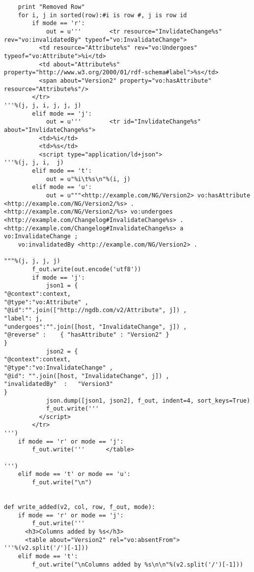\begin{verbatim}
	print "Removed Row"
	for i, j in sorted(row):#i is row #, j is row id
		if mode == 'r':
			out = u'''        <tr resource="InvlidateChange%s" rev="vo:invalidatedBy" typeof="vo:InvalidateChange">
          <td resource="Attribute%s" rev="vo:Undergoes" typeof="vo:Attribute">%i</td>
          <td about="Attribute%s" property="http://www.w3.org/2000/01/rdf-schema#label">%s</td>
          <span about="Version2" property="vo:hasAttribute" resource="Attribute%s"/>
        </tr>
'''%(j, j, i, j, j, j)
		elif mode == 'j':
			out = u'''        <tr id="InvlidateChange%s" about="InvlidateChange%s">
          <td>%i</td>
          <td>%s</td>
          <script type="application/ld+json">
'''%(j, j, i,  j)
		elif mode == 't':
			out = u"%i\t%s\n"%(i, j)
		elif mode == 'u':
			out = u"""<http://example.com/NG/Version2> vo:hasAttribute <http://example.com/NG/Version2/%s> .
<http://example.com/NG/Version2/%s> vo:undergoes <http://example.com/Changelog#InvalidateChange%s> .
<http://example.com/Changelog#InvalidateChange%s> a vo:InvalidateChange ;
	vo:invalidatedBy <http://example.com/NG/Version2> .

"""%(j, j, j, j)
		f_out.write(out.encode('utf8'))
		if mode == 'j':
			json1 = {
"@context":context,
"@type":"vo:Attribute" ,
"@id":"".join(["http://ngdb.com/v2/Attribute", j]) ,
"label": j,
"undergoes":"".join([host, "InvalidateChange", j]) ,
"@reverse" :    { "hasAttribute" : "Version2" }
}
			json2 = {
"@context":context,
"@type":"vo:InvalidateChange" ,
"@id": "".join([host, "InvalidateChange", j]) ,
"invalidatedBy"  :   "Version3"
}
			json.dump([json1, json2], f_out, indent=4, sort_keys=True)
			f_out.write('''
          </script>
        </tr>
''')
	if mode == 'r' or mode == 'j':
		f_out.write('''      </table>

''')
	elif mode == 't' or mode == 'u':
		f_out.write("\n")


def write_added(v2, col, row, f_out, mode):
	if mode == 'r' or mode == 'j':
		f_out.write('''
      <h3>Columns added by %s</h3>
      <table about="Version2" rel="vo:absentFrom">
'''%(v2.split('/')[-1]))
	elif mode == 't':
		f_out.write("\nColumns added by %s\n\n"%(v2.split('/')[-1]))
	

\end{verbatim}
